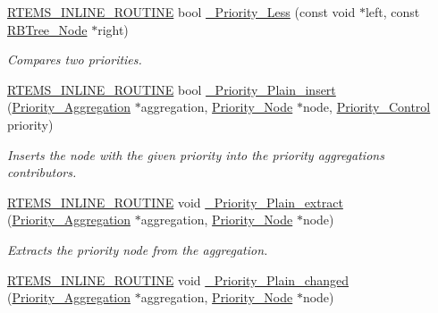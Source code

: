 \begin{DoxyCompactItemize}
\mbox{\hyperlink{group__RTEMSScoreBaseDefs_gac216239df231d5dbd15e3520b0b9313f}{R\+T\+E\+M\+S\+\_\+\+I\+N\+L\+I\+N\+E\+\_\+\+R\+O\+U\+T\+I\+NE}} bool \mbox{\hyperlink{group__RTEMSScorePriority_ga7b22bc7ca1475fd603d1929d34776453}{\+\_\+\+Priority\+\_\+\+Less}} (const void $\ast$left, const \mbox{\hyperlink{structRBTree__Node}{R\+B\+Tree\+\_\+\+Node}} $\ast$right)
\begin{DoxyCompactList}\small\item\em Compares two priorities. \end{DoxyCompactList}\item 
\mbox{\hyperlink{group__RTEMSScoreBaseDefs_gac216239df231d5dbd15e3520b0b9313f}{R\+T\+E\+M\+S\+\_\+\+I\+N\+L\+I\+N\+E\+\_\+\+R\+O\+U\+T\+I\+NE}} bool \mbox{\hyperlink{group__RTEMSScorePriority_ga2ced6d3277df7f8ed31b06d97f60e59d}{\+\_\+\+Priority\+\_\+\+Plain\+\_\+insert}} (\mbox{\hyperlink{structPriority__Aggregation}{Priority\+\_\+\+Aggregation}} $\ast$aggregation, \mbox{\hyperlink{structPriority__Node}{Priority\+\_\+\+Node}} $\ast$node, \mbox{\hyperlink{group__RTEMSScorePriority_ga59d02b58072d31a9a1cfe644557aefe2}{Priority\+\_\+\+Control}} priority)
\begin{DoxyCompactList}\small\item\em Inserts the node with the given priority into the priority aggregation\textquotesingle{}s contributors. \end{DoxyCompactList}\item 
\mbox{\hyperlink{group__RTEMSScoreBaseDefs_gac216239df231d5dbd15e3520b0b9313f}{R\+T\+E\+M\+S\+\_\+\+I\+N\+L\+I\+N\+E\+\_\+\+R\+O\+U\+T\+I\+NE}} void \mbox{\hyperlink{group__RTEMSScorePriority_ga3f23c793bc3fa87aa768c81154f1b54a}{\+\_\+\+Priority\+\_\+\+Plain\+\_\+extract}} (\mbox{\hyperlink{structPriority__Aggregation}{Priority\+\_\+\+Aggregation}} $\ast$aggregation, \mbox{\hyperlink{structPriority__Node}{Priority\+\_\+\+Node}} $\ast$node)
\begin{DoxyCompactList}\small\item\em Extracts the priority node from the aggregation. \end{DoxyCompactList}\item 
\mbox{\hyperlink{group__RTEMSScoreBaseDefs_gac216239df231d5dbd15e3520b0b9313f}{R\+T\+E\+M\+S\+\_\+\+I\+N\+L\+I\+N\+E\+\_\+\+R\+O\+U\+T\+I\+NE}} void \mbox{\hyperlink{group__RTEMSScorePriority_ga96c4da0740e220f6f9a130b00a08c336}{\+\_\+\+Priority\+\_\+\+Plain\+\_\+changed}} (\mbox{\hyperlink{structPriority__Aggregation}{Priority\+\_\+\+Aggregation}} $\ast$aggregation, \mbox{\hyperlink{structPriority__Node}{Priority\+\_\+\+Node}} $\ast$node)

\end{DoxyCompactItemize}
